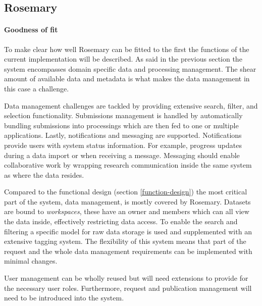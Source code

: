 \subsection{Rosemary}
\paragraph{Goodness of fit}
To make clear how well Rosemary can be fitted to the \project{} first the functions of the current implementation will be described.
As said in the previous section the system encompasses domain specific data and processing management.
The shear amount of available data and metadata is what makes the data management in this case a challenge.

Data management challenges are tackled by providing extensive search, filter, and selection functionality.
Submissions management is handled by automatically bundling submissions into processings which are then fed to one or multiple applications.
Lastly, notifications and messaging are supported.
Notifications provide users with system status information. 
For example, progress updates during a data import or when receiving a message.
Messaging should enable collaborative work by wrapping research communication inside the same system as where the data resides.

Compared to the functional design (section \ref{function-design}) the most critical part of the system, data management, is mostly covered by Rosemary.
Datasets are bound to \emph{workspaces}, these have an owner and members which can all view the data inside, effectively restricting data access.
To enable the search and filtering a specific model for raw data storage is used and supplemented with an extensive tagging system.
The flexibility of this system means that part of the request and the whole data management requirements can be implemented with minimal changes.

User management can be wholly reused but will need extensions to provide for the necessary user roles.
Furthermore, request and publication management will need to be introduced into the system.

